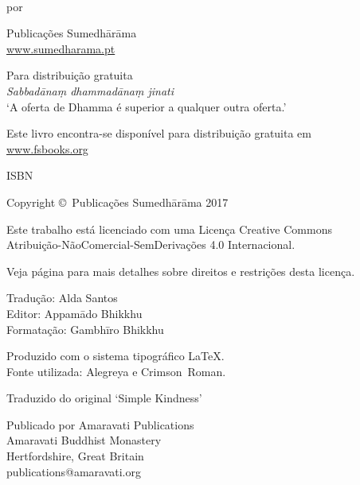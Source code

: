 \cleartoverso
\thispagestyle{empty}

{\copyrightsize
\centering
\setlength{\parindent}{0pt}%
\setlength{\parskip}{0.8\baselineskip}%

\thetitle\\
por \theauthor

Publicações Sumedhārāma\\
\href{http://sumedharama.pt}{www.sumedharama.pt}

Para distribuição gratuita\\
\textit{Sabbadānaṃ dhammadānaṃ jinati}\\
‘A oferta de Dhamma é superior a qualquer outra oferta.’

Este livro encontra-se disponível para distribuição gratuita em\\
\href{http://fsbooks.org/}{www.fsbooks.org}

ISBN \theISBN

Copyright \copyright\ Publicações Sumedhārāma 2017

Este trabalho está licenciado com uma Licença Creative Commons\\
Atribuição-NãoComercial-SemDerivações 4.0 Internacional.

Veja página \pageref{copyright-details} para mais detalhes sobre direitos e restrições desta licença.

\theEditionInfo

Tradução: Alda Santos\\
Editor: Appamādo Bhikkhu\\
Formatação: Gambhīro Bhikkhu

Produzido com o sistema tipográfico \LaTeX.\\
Fonte utilizada: Alegreya e Crimson~Roman.

\vfill

Traduzido do original `Simple Kindness'

Publicado por Amaravati Publications\\
Amaravati Buddhist Monastery\\
Hertfordshire, Great Britain\\
publications@amaravati.org

}
